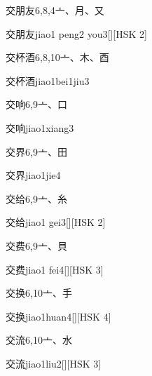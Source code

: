 \begin{entry}{交朋友}{6,8,4}{⼇、⽉、⼜}
  \begin{phonetics}{交朋友}{jiao1 peng2 you3}[][HSK 2]
  \end{phonetics}
\end{entry}

\begin{entry}{交杯酒}{6,8,10}{⼇、⽊、⾣}
  \begin{phonetics}{交杯酒}{jiao1bei1jiu3}
  \end{phonetics}
\end{entry}

\begin{entry}{交响}{6,9}{⼇、⼝}
  \begin{phonetics}{交响}{jiao1xiang3}
  \end{phonetics}
\end{entry}

\begin{entry}{交界}{6,9}{⼇、⽥}
  \begin{phonetics}{交界}{jiao1jie4}
  \end{phonetics}
\end{entry}

\begin{entry}{交给}{6,9}{⼇、⽷}
  \begin{phonetics}{交给}{jiao1 gei3}[][HSK 2]
  \end{phonetics}
\end{entry}

\begin{entry}{交费}{6,9}{⼇、⾙}
  \begin{phonetics}{交费}{jiao1 fei4}[][HSK 3]
  \end{phonetics}
\end{entry}

\begin{entry}{交换}{6,10}{⼇、⼿}
  \begin{phonetics}{交换}{jiao1huan4}[][HSK 4]
  \end{phonetics}
\end{entry}

\begin{entry}{交流}{6,10}{⼇、⽔}
  \begin{phonetics}{交流}{jiao1liu2}[][HSK 3]
  \end{phonetics}
\end{entry}

